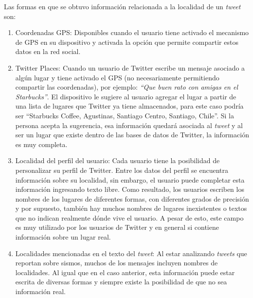 Las formas en que se obtuvo información relacionada a la localidad de un \textit{tweet} son:

\begin{enumerate}
\item Coordenadas GPS: Disponibles cuando el usuario tiene activado el mecanismo de GPS en su dispositivo y activada la opción que permite compartir estos datos en la red social.

\item Twitter Places: Cuando un usuario de Twitter escribe un mensaje asociado a algún lugar y tiene activado el GPS (no necesariamente permitiendo compartir las coordenadas), por ejemplo: \textit{``Que buen rato con amigas en el Starbucks''}. El dispositivo le sugiere al usuario agregar el lugar a partir de una lista de lugares que Twitter ya tiene almacenados, para este caso podría ser ``Starbucks Coffee, Agustinas, Santiago Centro, Santiago, Chile''. Si la persona acepta la sugerencia, esa información quedará asociada al \textit{tweet} y al ser un lugar que existe dentro de las bases de datos de Twitter, la información es muy completa.

\item Localidad del perfil del usuario: Cada usuario tiene la posibilidad de personalizar su perfil de Twitter. Entre los datos del perfil se encuentra información sobre su localidad, sin embargo, el usuario puede completar esta información ingresando texto libre. Como resultado, los usuarios escriben los nombres de los lugares de diferentes formas, con diferentes grados de precisión y por supuesto, también hay muchos nombres de lugares inexistentes o textos que no indican realmente dónde vive el usuario. A pesar de esto, este campo es muy utilizado por los usuarios de Twitter y en general si contiene información sobre un lugar real. 

\item Localidades mencionadas en el texto del \textit{tweet}: Al estar analizando \textit{tweets} que reportan sobre sismos, muchos de los mensajes incluyen nombres de localidades. Al igual que en el caso anterior, esta información puede estar escrita de diversas formas y siempre existe la posibilidad de que no sea información real. %

\end{enumerate} 


